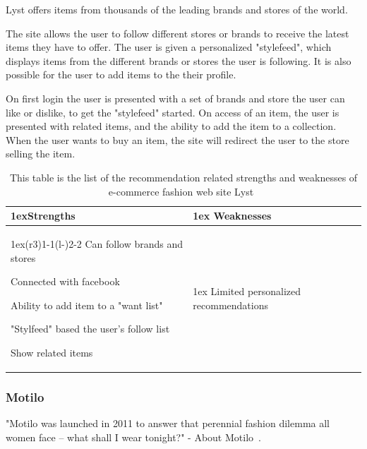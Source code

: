     Lyst offers items from thousands of the leading brands and stores of the world.

    The site allows the user to follow different stores or brands to receive the latest items they have to offer.
    The user is given a personalized "stylefeed", which displays items from the different brands or stores the user is following.
    It is also possible for the user to add items to the their profile.

    On first login the user is presented with a set of brands and store the user can like or dislike, to get the "stylefeed" started.
    On access of an item, the user is presented with related items, and the ability to add the item to a collection.
    When the user wants to buy an item, the site will redirect the user to the store selling the item.

    \begin{table}[H]
    	\centering
        \begin{tabularx}{\linewidth}{>{\parskip1ex}X@{\kern4\tabcolsep}>{\parskip1ex}X}
        \toprule
        	\hfil\bfseries Strengths
            &
            \hfil\bfseries Weaknesses
            \\\cmidrule(r{3\tabcolsep}){1-1}\cmidrule(l{-\tabcolsep}){2-2}
                    Can follow brands and stores \par
                    Connected with facebook \par
                    Ability to add item to a "want list" \par
                    "Stylfeed" based the user's follow list \par
                    Show related items \par
                    &
                    Limited personalized recommendations \par
                    \\\bottomrule
                \end{tabularx}
        \caption[Recommendation related strengths and weaknesses of Lyst~\cite{lyst}]{This table is the list of the recommendation related strengths and weaknesses of e-commerce fashion web site Lyst~\cite{lyst}}
        \label{table:ecommenreceLyst}
    \end{table}

\subsubsection{Motilo} %
\label{par:motilo}
    "Motilo was launched in 2011 to answer that perennial fashion dilemma all women face – what shall I wear tonight?" - About Motilo~\cite{motilo}.

